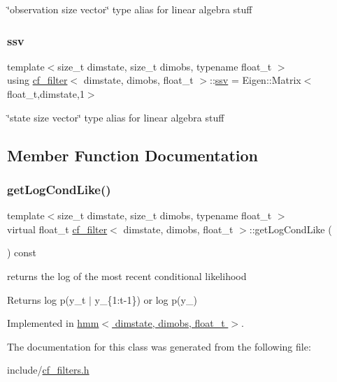 \char`\"{}observation size vector\char`\"{} type alias for linear algebra stuff \mbox{\label{classcf__filter_ad4bce534d6b7a494dae851846037c94b}} 
\subsubsection{\texorpdfstring{ssv}{ssv}}
{\footnotesize\ttfamily template$<$size\+\_\+t dimstate, size\+\_\+t dimobs, typename float\+\_\+t $>$ \\
using \hyperlink{classcf__filter}{cf\+\_\+filter}$<$ dimstate, dimobs, float\+\_\+t $>$\+::\hyperlink{classcf__filter_ad4bce534d6b7a494dae851846037c94b}{ssv} =  Eigen\+::\+Matrix$<$float\+\_\+t,dimstate,1$>$}

\char`\"{}state size vector\char`\"{} type alias for linear algebra stuff 

\subsection{Member Function Documentation}
\mbox{\label{classcf__filter_a11b26307172bf94b8075ed2cdb8fc09c}} 
\subsubsection{\texorpdfstring{get\+Log\+Cond\+Like()}{getLogCondLike()}}
{\footnotesize\ttfamily template$<$size\+\_\+t dimstate, size\+\_\+t dimobs, typename float\+\_\+t $>$ \\
virtual float\+\_\+t \hyperlink{classcf__filter}{cf\+\_\+filter}$<$ dimstate, dimobs, float\+\_\+t $>$\+::get\+Log\+Cond\+Like (\begin{DoxyParamCaption}{ }\end{DoxyParamCaption}) const\hspace{0.3cm}{\ttfamily [pure virtual]}}



returns the log of the most recent conditional likelihood 

\begin{DoxyReturn}{Returns}
log p(y\+\_\+t $\vert$ y\+\_\+\{1\+:t-\/1\}) or log p(y\+\_) 
\end{DoxyReturn}


Implemented in \hyperlink{classhmm_a588f2aed002614e75f523213eba1b290}{hmm$<$ dimstate, dimobs, float\+\_\+t $>$}.



The documentation for this class was generated from the following file\+:\begin{DoxyCompactItemize}
\item 
include/\hyperlink{cf__filters_8h}{cf\+\_\+filters.\+h}\end{DoxyCompactItemize}
